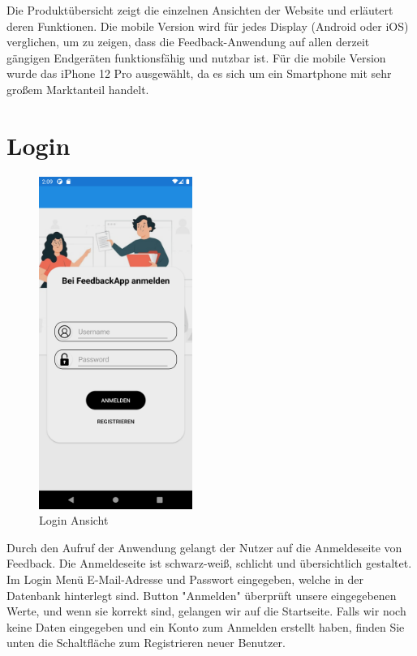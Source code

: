 Die Produktübersicht zeigt die einzelnen Ansichten der Website und erläutert deren 
Funktionen. Die mobile Version wird für jedes Display (Android oder iOS) verglichen, 
um zu zeigen, dass die Feedback-Anwendung auf allen derzeit gängigen Endgeräten 
funktionsfähig und nutzbar ist. Für die mobile Version wurde das iPhone 12 Pro 
ausgewählt, da es sich um ein Smartphone mit sehr großem Marktanteil handelt.
\newpage

\section{Login}
\vspace{4cm}
\begin{figure}[h]
    \begin{center}
        \includegraphics*[width=5cm]{pics/Xamarin Student/1 Login Page.png}
        \caption[LoginPage Ansicht]{Login Ansicht}
    \end{center}
\end{figure}
Durch den Aufruf der Anwendung gelangt der Nutzer auf die Anmeldeseite 
von Feedback. Die Anmeldeseite ist schwarz-weiß, schlicht und übersichtlich gestaltet.
Im Login Menü E-Mail-Adresse und Passwort eingegeben, welche in 
der Datenbank hinterlegt sind. Button "Anmelden" überprüft unsere 
eingegebenen Werte, und wenn sie korrekt sind, gelangen wir auf die Startseite.
Falls wir noch keine Daten eingegeben und ein Konto zum Anmelden erstellt haben, 
finden Sie unten die Schaltfläche zum Registrieren neuer Benutzer.
\newpage

